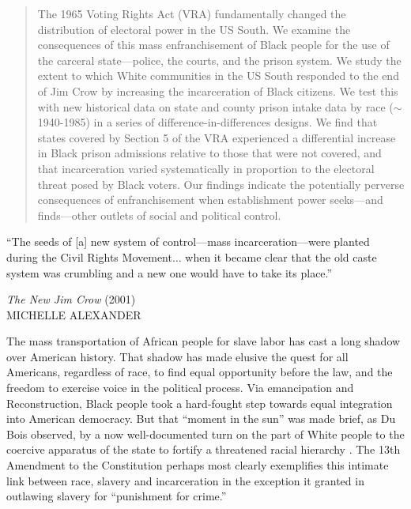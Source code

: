 \documentclass[12pt]{article}
\begin{document}
\begin{abstract}
\bigskip \onehalfspacing
\noindent The 1965 Voting Rights Act (VRA) fundamentally changed the distribution of electoral power in the US South.  We examine the consequences of this mass enfranchisement of Black people for the use of the carceral state---police, the courts, and the prison system.  We study the extent to which White communities in the US South responded to the end of Jim Crow by increasing the incarceration of Black citizens. We test this with new historical data on state and county prison intake data by race ($\sim$1940-1985) in a series of difference-in-differences designs. We find that states covered by Section 5 of the VRA experienced a differential increase in Black prison admissions relative to those that were not covered, and that incarceration varied systematically in proportion to the electoral threat posed by Black voters.  Our findings indicate the potentially perverse consequences of enfranchisement when establishment power seeks---and finds---other outlets of social and political control.
\end{abstract}

\newpage \clearpage





\singlespacing
\vspace{.2in}
\epigraph{``The seeds of [a] new system of control---mass incarceration---were planted during the Civil Rights Movement$\ldots$ when it became clear that the old caste system was crumbling and a new one would have to take its place.''}	{\footnotesize \textit{The New Jim Crow}  (2001)\\ \scriptsize MICHELLE ALEXANDER}

\vspace{.2in}

\onehalfspacing






The mass transportation of African people for slave labor has cast a long shadow over American history.  That shadow has made elusive the quest for all Americans, regardless of race, to find equal opportunity before the law, and the freedom to exercise voice in the political process.  Via emancipation and Reconstruction, Black people took a hard-fought step towards equal integration into American democracy.  But that ``moment in the sun'' was made brief, as Du Bois observed, by a now well-documented turn on the part of White people to the coercive apparatus of the state to fortify a threatened racial hierarchy  \citep{DuBois:1998vn,Lichtenstein:1996ug,Oshinsky:1997up,Blackmon:2009wo,Muhammad:2011wf,LeFlouria:2015vj}.  The 13th Amendment to the Constitution perhaps most clearly exemplifies this intimate link between race, slavery and incarceration in the exception it granted in outlawing slavery for ``punishment for crime.''
\end{document}
